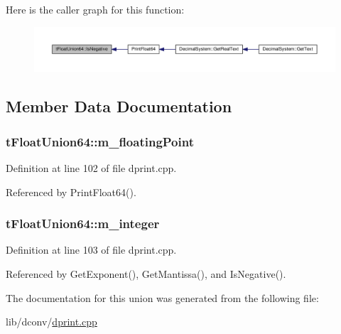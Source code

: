 Here is the caller graph for this function\+:
\nopagebreak
\begin{figure}[H]
\begin{center}
\leavevmode
\includegraphics[width=350pt]{d4/d4a/uniontFloatUnion64_acef6b9abed06d568b90ed31592e13242_icgraph}
\end{center}
\end{figure}




\subsection{Member Data Documentation}
\subsubsection[{\texorpdfstring{m\+\_\+floating\+Point}{m_floatingPoint}}]{ t\+Float\+Union64\+::m\+\_\+floating\+Point}\hypertarget{uniontFloatUnion64_aac8887130a7750b7ed3e38d2172e0d4d}{}\label{uniontFloatUnion64_aac8887130a7750b7ed3e38d2172e0d4d}


Definition at line 102 of file dprint.\+cpp.



Referenced by Print\+Float64().

\subsubsection[{\texorpdfstring{m\+\_\+integer}{m_integer}}]{ t\+Float\+Union64\+::m\+\_\+integer}\hypertarget{uniontFloatUnion64_a7579348287571c05c408cda342217d91}{}\label{uniontFloatUnion64_a7579348287571c05c408cda342217d91}


Definition at line 103 of file dprint.\+cpp.



Referenced by Get\+Exponent(), Get\+Mantissa(), and Is\+Negative().



The documentation for this union was generated from the following file\+:\begin{DoxyCompactItemize}
\item 
lib/dconv/\hyperlink{dprint_8cpp}{dprint.\+cpp}\end{DoxyCompactItemize}
